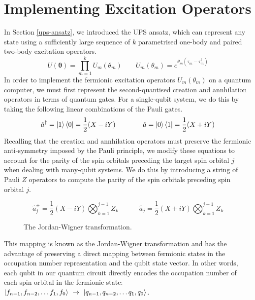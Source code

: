 \section{Implementing Excitation Operators}%
\label{implementing-excitation-operators}

In Section \ref{ups-ansatz}, we introduced the UPS ansatz, which can represent any state using a sufficiently large sequence of $k$ parametrised one-body and paired two-body excitation operators.
\begin{equation*}
    U(\bm\theta) = \prod_{m=1}^k U_m(\theta_m) \qquad
    U_m(\theta_m) = e^{\theta_m (\tau_m - \tau_m^\dagger)}
\end{equation*}
In order to implement the fermionic excitation operators $U_m(\theta_m)$ on a quantum computer, we must first represent the second-quantised creation and annhilation operators in terms of quantum gates. For a single-qubit system, we do this by taking the following linear combinations of the Pauli gates.
\begin{equation*}
    \hat a^\dagger = \ket 1 \bra 0 = \frac{1}{2} (X - iY) \qquad\qquad
    \hat a = \ket 0 \bra 1 = \frac{1}{2} (X + iY) 
\end{equation*}
Recalling that the creation and annhilation operators must preserve the fermionic anti-symmetry imposed by the Pauli principle, we modify these equations to account for the parity of the spin orbitals preceding the target spin orbital $j$ when dealing with many-qubit systems. We do this by introducing a string of Pauli $Z$ operators to compute the parity of the spin orbitals preceding spin orbital $j$.

\begin{figure}[H]
    \centering
    \begin{equation*}
        \hat a_j^+ = \frac{1}{2} (X - iY) \bigotimes_{k=1}^{j-1} Z_k \qquad\quad
        \hat a_j = \frac{1}{2} (X + iY) \bigotimes_{k=1}^{j-1} Z_k
    \end{equation*}
    \caption{The Jordan-Wigner transformation.}
    \label{jordan-wigner}
\end{figure}

This mapping is known as the Jordan-Wigner transformation \cite{Seeley2020} and has the advantage of preserving a direct mapping between fermionic states in the occupation number representation and the qubit state vector. In other words, each qubit in our quantum circuit directly encodes the occupation number of each spin orbital in the fermionic state: $\ket{f_{n-1}, f_{n-2}, \dots f_1, f_0} \,\,\rightarrow\,\, \ket{q_{n-1}, q_{n-2}, \dots q_1, q_0}$.

